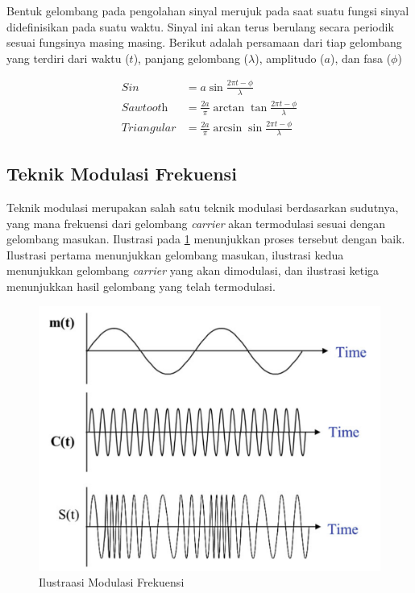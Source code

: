 Bentuk gelombang pada pengolahan sinyal merujuk pada saat suatu fungsi sinyal didefinisikan pada suatu waktu. Sinyal ini akan terus berulang secara periodik sesuai fungsinya masing masing. Berikut adalah persamaan dari tiap gelombang yang terdiri dari waktu ($t$), panjang gelombang ($\lambda$), amplitudo ($a$), dan fasa ($\phi$)

\begin{align}
	Sin &= a \sin \frac{2 \pi t - \phi}{\lambda} \\
	\textit{Sawtooth} &= \frac{2 a}{\pi} \arctan \tan \frac{2 \pi t - \phi}{\lambda} \\
	\textit{Triangular} &= \frac{2 a}{\pi} \arcsin \sin \frac{2 \pi t - \phi}{\lambda}
\end{align}

\subsection{Teknik Modulasi Frekuensi} 
Teknik modulasi merupakan salah satu teknik modulasi berdasarkan sudutnya, yang mana frekuensi dari gelombang \textit{carrier} akan termodulasi sesuai dengan gelombang masukan. Ilustrasi pada \ref{pic:modfrek} menunjukkan proses tersebut dengan baik. Ilustrasi pertama menunjukkan gelombang masukan, ilustrasi kedua menunjukkan gelombang \textit{carrier} yang akan dimodulasi, dan ilustrasi ketiga menunjukkan hasil gelombang yang telah termodulasi.
\begin{figure}
	\begin{center}
		\includegraphics[scale=0.3]{pics/bab2/ilustrasimodfrek.png} 
		\caption[Modulasi Frekuensi]{Ilustraasi Modulasi Frekuensi \cite{Faruque2017}}
		\label{pic:modfrek}
	\end{center}
\end{figure}

